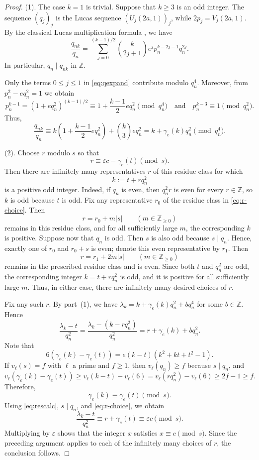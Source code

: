 \documentclass[12pt]{amsart}
\numberwithin{equation}{section}
\theoremstyle{remark}
\theoremstyle{plain}
\newcommand{\Z}{\mathbb{Z}}
\begin{document}
\begin{proof}
\textup{(1)}. The case $k=1$ is trivial. Suppose that $k\geq3$ is an odd integer. The sequence $(q_j)_j$ is the Lucas sequence $\left(U_j(2a,1)\right)_j$, while $2p_j=V_j(2a,1)$. By the classical Lucas multiplication formula \cite[(2.28)]{BW23}, we have
\begin{equation}\label{eq:qexpand}
	\frac{q_{nk}}{q_n}
	=\sum_{j=0}^{(k-1)/2}\binom{k}{2j+1}e^j
	p_n^{k-2j-1}q_n^{2j}.
\end{equation}
In particular, $q_n\mid q_{nk}$ in $\Z$.

Only the terms $0\leq j\leq1$ in \eqref{eq:qexpand} contribute modulo $q_n^4$. Moreover, from $p_n^2-eq_n^2=1$ we obtain
\[
p_n^{k-1}=(1+eq_n^2)^{(k-1)/2}\equiv1+\frac{k-1}{2}eq_n^2\pmod{q_n^4}\quad\text{and}\quad p_n^{k-3}\equiv1\pmod{q_n^2}.
\]
Thus,
\[
\frac{q_{nk}}{q_n}\equiv k\left(1+\frac{k-1}{2}eq_n^2\right)+\binom{k}{3}eq_n^2=k+\gamma_e(k)q_n^2\pmod{q_n^4}.
\]

\smallskip

\textup{(2)}.
Choose $r$ modulo $s$ so that
\begin{equation}\label{eq:r-choice}
r\equiv\varepsilon c-\gamma_e(t)\pmod{s}.
\end{equation}
Then there are infinitely many representatives $r$ of this residue class for which
\[
k:=t+r q_n^2
\]
is a positive odd integer. Indeed, if $q_n$ is even, then $q_n^2r$ is even for every $r\in\Z$, so $k$ is odd because $t$ is odd. Fix any representative $r_0$ of the residue class in \eqref{eq:r-choice}. Then
\[
r=r_0+m|s|\qquad(m\in\Z_{\geq0})
\]
remains in this residue class, and for all sufficiently large $m$, the corresponding $k$ is positive. Suppose now that $q_n$ is odd. Then $s$ is also odd because $s\mid q_n$. Hence, exactly one of $r_0$ and $r_0+s$ is even; denote this even representative by $r_1$. Then
\[
r=r_1+2m|s|\qquad(m\in\Z_{\geq0})
\]
remains in the prescribed residue class and is even. Since both $t$ and $q_n^2$ are odd, the corresponding integer $k=t+r q_n^2$ is odd, and it is positive for all sufficiently large $m$. Thus, in either case, there are infinitely many desired choices of $r$.

Fix any such $r$. By part~\textup{(1)}, we have $\lambda_k=k+\gamma_e(k)q_n^2+bq_n^4$ for some $b\in\Z$. Hence
\begin{equation}\label{eq:rescalc}
\frac{\lambda_k-t}{q_n^2}=\frac{\lambda_k-(k-rq_n^2)}{q_n^2}=r+\gamma_e(k)+bq_n^2.
\end{equation}
Note that
\[
6\left(\gamma_e(k)-\gamma_e(t)\right)=e(k-t)(k^2+kt+t^2-1).
\]
If $v_\ell(s)=f$ with $\ell$ a prime and $f\geq1$, then
$v_\ell(q_n)\geq f$ because $s\mid q_n$, and
\[
v_\ell\left(\gamma_e(k)-\gamma_e(t)\right)\geq v_\ell(k-t)-v_\ell(6)=v_\ell(rq_n^2)-v_\ell(6)\geq2f-1\geq f.
\]
Therefore,
\[
\gamma_e(k)\equiv\gamma_e(t)\pmod{s}.
\]
Using \eqref{eq:rescalc}, $s\mid q_n$, and \eqref{eq:r-choice}, we obtain
\[
\frac{\lambda_k-t}{q_n^2}
\equiv r+\gamma_e(t)
\equiv\varepsilon c\pmod{s}.
\]
Multiplying by $\varepsilon$ shows that the integer $x$ satisfies $x\equiv c\pmod{s}$. Since the preceding argument applies to each of the infinitely many choices of $r$, the conclusion follows.
\end{proof}
\end{document}

